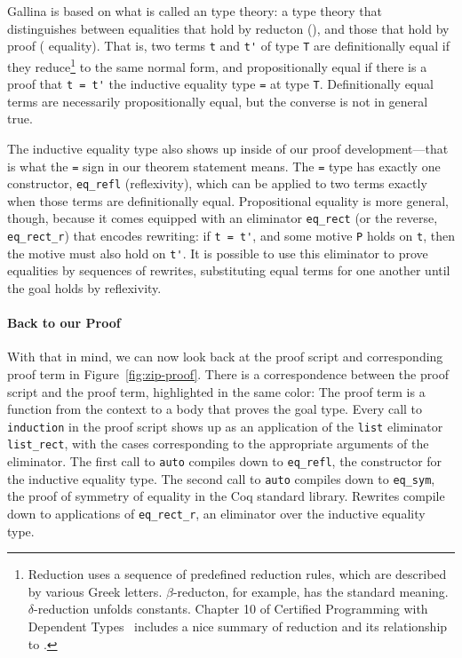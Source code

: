 Gallina is based on what is called an  type theory:
a type theory that distinguishes between equalities that hold by reducton (), and those that hold by proof ( equality).
That is, two terms \lstinline{t} and \lstinline{t'} of type \lstinline{T} are definitionally equal if they
reduce\footnote{Reduction uses a sequence of predefined reduction rules, which are described by various Greek letters. $\beta$-reducton, for example,
has the standard meaning. $\delta$-reduction unfolds constants. Chapter 10 of Certified Programming with Dependent Types~\cite{chlipala:cpdt} includes a nice summary of reduction and its relationship to .} 
to the same normal form,
and propositionally equal if there is a proof that \lstinline{t = t'} the inductive
equality type \lstinline{=} at type \lstinline{T}. Definitionally equal terms are necessarily propositionally equal, but 
the converse is not in general true. %

The inductive equality type also shows up inside of our proof development---that is what the \lstinline{=} sign in our theorem statement means.
The \lstinline{=} type has exactly one constructor, \lstinline{eq_refl} (reflexivity), which can be applied to two terms exactly when those terms are definitionally equal.
Propositional equality is more general, though, because it comes equipped with an eliminator \lstinline{eq_rect} (or the reverse, \lstinline{eq_rect_r})
that encodes rewriting: if \lstinline{t = t'}, and some motive \lstinline{P} holds on \lstinline{t}, then the motive must also hold on \lstinline{t'}.
It is possible to use this eliminator to prove equalities by sequences of rewrites, substituting equal terms for one another until the goal holds by reflexivity.

\paragraph{Back to our Proof}

With that in mind, we can now look back at the proof script and corresponding proof term in Figure~\ref{fig:zip-proof}.
There is a correspondence between the proof script and the proof term, highlighted in the same color:
The proof term is a function from the context to a body that proves the goal type.
Every call to \lstinline{induction} in the proof script shows up as an application of the \lstinline{list} eliminator 
\lstinline{list_rect}, with the cases corresponding to the appropriate arguments of the eliminator.
The first call to \lstinline{auto} compiles down to \lstinline{eq_refl}, the constructor for the inductive equality type.
The second call to \lstinline{auto} compiles down to \lstinline{eq_sym}, the proof of symmetry of equality in the Coq standard library. %
Rewrites compile down to applications of \lstinline{eq_rect_r}, an eliminator over the inductive equality type.

